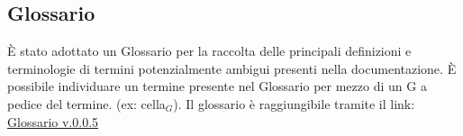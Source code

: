 \subsection{Glossario}
È stato adottato un Glossario per la raccolta delle principali definizioni e terminologie di termini potenzialmente ambigui presenti nella documentazione.
È possibile individuare un termine presente nel Glossario per mezzo di un G a pedice del termine.
(ex: cella\(_G\)).
\vspace{0.1cm}
Il glossario è raggiungibile tramite il link: \href{https://github.com/ByteOps-swe/Documents/blob/main/RTB/Glossario%20v0.0.5.pdf}{Glossario v.0.0.5}
